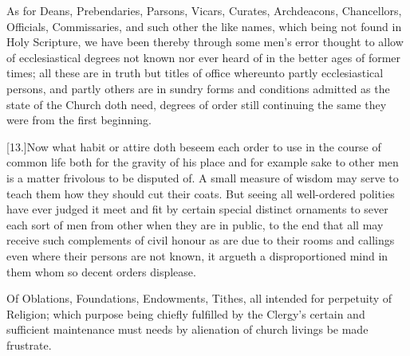 As for Deans, Prebendaries, Parsons, Vicars, Curates, Archdeacons, Chancellors, Officials, Commissaries, and such other the like names, which being not found in Holy Scripture, we have been thereby through some men’s error thought to allow of ecclesiastical degrees not known nor ever heard of in the better ages of former times; all these are in truth but titles of office whereunto partly ecclesiastical persons, and partly others are in sundry forms and conditions admitted as the state of the Church doth need, degrees of order still continuing the same they were from the first beginning.

[13.]Now what habit or attire doth beseem each order to use in the course of common life both for the gravity of his  place and for example sake to other men is a matter frivolous to be disputed of.
 A small measure of wisdom may serve to teach them how they should cut their coats. But seeing all well-ordered polities have ever judged it meet and fit by certain special distinct ornaments to sever each sort of men from other when they are in public, to the end that all may receive such complements of civil honour as are due to their rooms and callings even where their persons are not known, it argueth a disproportioned mind in them whom so decent orders displease.


Of Oblations, Foundations, Endowments, Tithes, all intended for perpetuity of Religion; which purpose being chiefly fulfilled by the Clergy’s certain and sufficient maintenance must needs by alienation of church livings be made frustrate.
